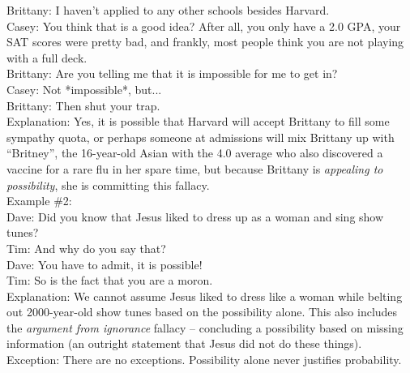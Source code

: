 \documentclass[a4paper,12pt,single,pdftex]{scrartcl}
\begin{document}
    
      Brittany: I haven’t applied to any other schools besides Harvard.
    \\

    
      Casey: You think that is a good idea?  After all, you only have a 2.0 GPA, your SAT scores were pretty bad, and frankly, most people think you are not playing with a full deck.
    \\

    
      Brittany: Are you telling me that it is impossible for me to get in?
    \\

    
      Casey: Not *impossible*, but...
    \\

    
      Brittany: Then shut your trap.
    \\

    
      Explanation: Yes, it is possible that Harvard will accept Brittany to fill some sympathy quota, or perhaps someone at admissions will mix Brittany up with “Britney”, the 16-year-old Asian with the 4.0 average who also discovered a vaccine for a rare flu in her spare time, but because Brittany is {\it appealing to possibility}, she is committing this fallacy.
    \\

    
      Example \#2:
    \\

    
      Dave: Did you know that Jesus liked to dress up as a woman and sing show tunes?
    \\

    
      Tim: And why do you say that?
    \\

    
      Dave: You have to admit, it is possible!
    \\

    
      Tim: So is the fact that you are a moron.
    \\

    
      Explanation: We cannot assume Jesus liked to dress like a woman while belting out 2000-year-old show tunes based on the possibility alone. This also includes the {\it argument from ignorance} fallacy -- concluding a possibility based on missing information (an outright statement that Jesus did not do these things).
    \\

    
      Exception:  There are no exceptions. Possibility alone never justifies probability.
    \\
\end{document}

